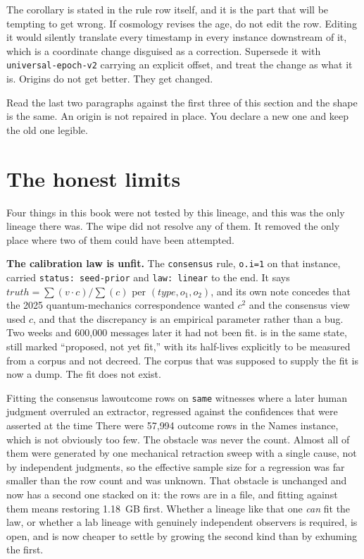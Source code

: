 The corollary is stated in the rule row itself, and it is the part that will be tempting to get wrong. If cosmology revises the age, do not edit the row. Editing it would silently translate every timestamp in every instance downstream of it, which is a coordinate change disguised as a correction. Supersede it with \texttt{universal-epoch-v2} carrying an explicit offset, and treat the change as what it is. Origins do not get better. They get changed.

Read the last two paragraphs against the first three of this section and the shape is the same. An origin is not repaired in place. You declare a new one and keep the old one legible.

\section{The honest limits}
\label{sec:limits}

Four things in this book were not tested by this lineage, and this was the only lineage there was. The wipe did not resolve any of them. It removed the only place where two of them could have been attempted.

\textbf{The calibration law is unfit.} The \texttt{consensus} rule, \texttt{o.i=1} on that instance, carried \texttt{status: seed-prior} and \texttt{law: linear} to the end. It says $truth = \sum(v \cdot c) / \sum(c)$ per $(type, o_1, o_2)$, and its own note concedes that the 2025 quantum-mechanics correspondence wanted $c^2$ and the consensus view used $c$, and that the discrepancy is an empirical parameter rather than a bug. Two weeks and 600{,}000 messages later it had not been fit.  is in the same state, still marked ``proposed, not yet fit,'' with its half-lives explicitly to be measured from a corpus and not decreed. The corpus that was supposed to supply the fit is now a dump. The fit does not exist.

\begin{Open}{Fitting the consensus law}{outcome rows on \texttt{same} witnesses where a later human judgment overruled an extractor, regressed against the confidences that were asserted at the time}
There were 57{,}994 outcome rows in the Names instance, which is not obviously too few. The obstacle was never the count. Almost all of them were generated by one mechanical retraction sweep with a single cause, not by independent judgments, so the effective sample size for a regression was far smaller than the row count and was unknown. That obstacle is unchanged and now has a second one stacked on it: the rows are in a file, and fitting against them means restoring 1.18~GB first. Whether a lineage like that one \emph{can} fit the law, or whether a lab lineage with genuinely independent observers is required, is open, and is now cheaper to settle by growing the second kind than by exhuming the first.
\end{Open}

